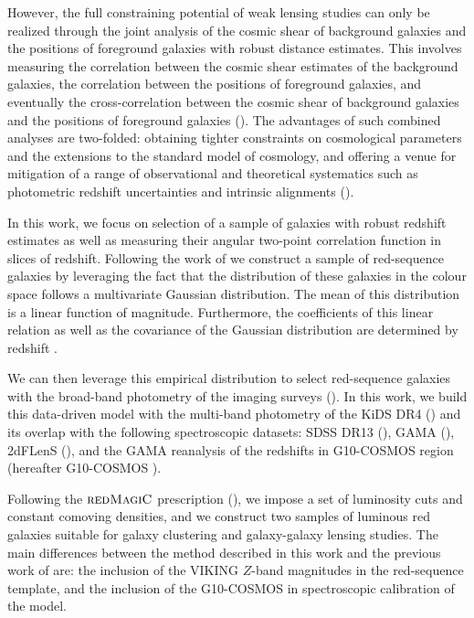 \documentclass[fleqn,usenatbib,useAMS]{mnras}
\begin{document}
However, the full constraining potential of weak lensing studies can only be realized through the joint analysis of the cosmic shear of background galaxies and the positions of foreground galaxies with robust distance estimates. This involves measuring the correlation between the cosmic shear estimates of the background galaxies, the correlation between the positions of foreground galaxies, and eventually the cross-correlation between the cosmic shear of background galaxies and the positions of foreground galaxies (\citealt{cacciato2013, cosmolike, des_y1_cosmology, elvin2017, edo2018, prat2017}). 
The advantages of such combined analyses are two-folded: obtaining tighter constraints on cosmological parameters and the extensions to the standard model of cosmology, and offering a venue for mitigation of a range of observational and theoretical systematics such as photometric redshift uncertainties and intrinsic alignments (\citealt{edo2016, joudaki2018, sam2019}). 

In this work, we focus on selection of a sample of galaxies with robust redshift estimates as well as measuring their angular two-point correlation function in slices of redshift. Following the work of \citet{vakili2019} we construct a sample of red-sequence galaxies by leveraging the fact that the distribution of these galaxies in the colour space follows a multivariate Gaussian distribution. The mean of this distribution is a linear function of magnitude. Furthermore, the coefficients of this linear relation as well as the covariance of the Gaussian distribution are determined by redshift \citep[e.g.][]{bower1992,ellis1997,gladders1998,stanford1998}. 

We can then leverage this empirical distribution to select red-sequence galaxies with the broad-band photometry of the imaging surveys (\citealt{gladders_yee2000,hao2009,redmap_sdss,rozo2016,elvin2017,oguri2018,vakili2019}). In this work, we build this data-driven model with the multi-band photometry of the KiDS DR4 (\citealt{kuijken2019}) and its overlap with the following spectroscopic datasets: SDSS DR13 (\citealt{sdss_dr13}), GAMA (\citealt{driver2011}), 2dFLenS (\citealt{blake2016}), and the GAMA reanalysis of the redshifts in G10-COSMOS region (hereafter G10-COSMOS \citealt{davis2015}). 


Following the $\textsc{redMagiC}$ prescription (\citealt{rozo2016}), we impose a set of luminosity cuts and constant comoving densities, and we construct two samples of luminous red galaxies suitable for galaxy clustering and galaxy-galaxy lensing studies. The main differences between the method described in this work and the previous work of \citet{vakili2019} are: the inclusion of the VIKING $Z$-band magnitudes in the red-sequence template, and the inclusion of the G10-COSMOS in spectroscopic calibration of the model. %
\end{document}
